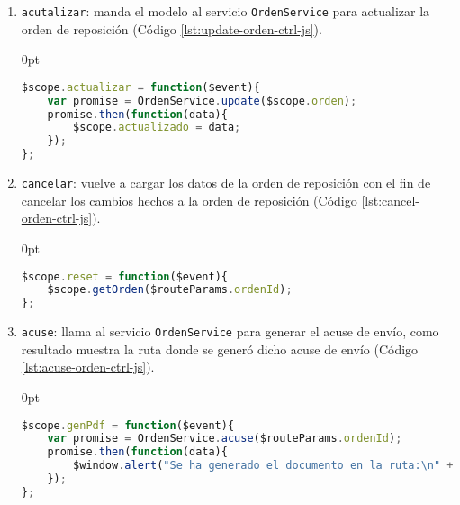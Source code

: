\begin{enumerate}
\begin{enumerate}
	\item \texttt{acutalizar}: manda el modelo al servicio \texttt{OrdenService} para actualizar la orden de reposición (Código \ref{lst:update-orden-ctrl-js}).
\begin{adjustwidth}{\listingfixlargewidth}{0pt}
\begin{lstlisting}[language=Javascript, caption={Función del controlador de \textit{AngularJS} para actualizar una orden de reposición.}, captionpos=b, label={lst:update-orden-ctrl-js}]
$scope.actualizar = function($event){
	var promise = OrdenService.update($scope.orden);
	promise.then(function(data){
		$scope.actualizado = data;
	});
};
\end{lstlisting}
\end{adjustwidth}

	\item \texttt{cancelar}: vuelve a cargar los datos de la orden de reposición con el fin de cancelar los cambios hechos a la orden de reposición (Código \ref{lst:cancel-orden-ctrl-js}).
\begin{adjustwidth}{\listingfixlargewidth}{0pt}
\begin{lstlisting}[language=Javascript, caption={Función del controlador de \textit{AngularJS} para cancelar los cambios en una orden de reposición.}, captionpos=b, label={lst:cancel-orden-ctrl-js}]
$scope.reset = function($event){
	$scope.getOrden($routeParams.ordenId);
};
\end{lstlisting}
\end{adjustwidth}

\pagebreak

	\item \texttt{acuse}: llama al servicio \texttt{OrdenService} para generar el acuse de envío, como resultado muestra la ruta donde se generó dicho acuse de envío (Código \ref{lst:acuse-orden-ctrl-js}).
\begin{adjustwidth}{\listingfixlargewidth}{0pt}
\begin{lstlisting}[language=Javascript, caption={Función del controlador de \textit{AngularJS} para generar el acuse de envío de la orden de reposición.}, captionpos=b, label={lst:acuse-orden-ctrl-js}]
$scope.genPdf = function($event){
	var promise = OrdenService.acuse($routeParams.ordenId);
	promise.then(function(data){
		$window.alert("Se ha generado el documento en la ruta:\n" + data);
	});
};
\end{lstlisting}
\end{adjustwidth}


\end{enumerate}
\end{enumerate}

